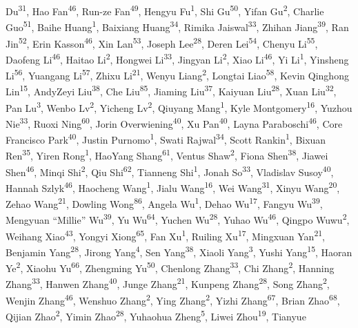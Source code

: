 Du\textsuperscript{31}, Hao Fan\textsuperscript{46}, Run-ze Fan\textsuperscript{49}, Hengyu Fu\textsuperscript{1}, Shi Gu\textsuperscript{50}, Yifan Gu\textsuperscript{2}, Charlie Guo\textsuperscript{51}, Baihe Huang\textsuperscript{1}, Baixiang Huang\textsuperscript{34}, Rimika Jaiswal\textsuperscript{33}, Zhihan Jiang\textsuperscript{39}, Ran Jin\textsuperscript{52}, Erin Kasson\textsuperscript{46}, Xin Lan\textsuperscript{53}, Joseph Lee\textsuperscript{28}, Deren Lei\textsuperscript{54}, Chenyu Li\textsuperscript{55}, Daofeng Li\textsuperscript{46}, Haitao Li\textsuperscript{2}, Hongwei Li\textsuperscript{33}, Jingyan Li\textsuperscript{2}, Xiao Li\textsuperscript{46}, Yi Li\textsuperscript{1}, Yinsheng Li\textsuperscript{56}, Yuangang Li\textsuperscript{57}, Zhixu Li\textsuperscript{21}, Wenyu Liang\textsuperscript{2}, Longtai Liao\textsuperscript{58}, Kevin Qinghong Lin\textsuperscript{15}, AndyZeyi Liu\textsuperscript{38}, Che Liu\textsuperscript{85}, Jiaming Liu\textsuperscript{37}, Kaiyuan Liu\textsuperscript{28}, Xuan Liu\textsuperscript{32}, Pan Lu\textsuperscript{3}, Wenbo Lv\textsuperscript{2}, Yicheng Lv\textsuperscript{2}, Qiuyang Mang\textsuperscript{1}, Kyle Montgomery\textsuperscript{16}, Yuzhou Nie\textsuperscript{33}, Ruoxi Ning\textsuperscript{60}, Jorin Overwiening\textsuperscript{40}, Xu Pan\textsuperscript{40}, Layna Paraboschi\textsuperscript{46}, Core Francisco Park\textsuperscript{40}, Justin Purnomo\textsuperscript{1}, Swati Rajwal\textsuperscript{34}, Scott Rankin\textsuperscript{1}, Bixuan Ren\textsuperscript{35}, Yiren Rong\textsuperscript{1}, HaoYang Shang\textsuperscript{61}, Ventus Shaw\textsuperscript{2}, Fiona Shen\textsuperscript{38}, Jiawei Shen\textsuperscript{46}, Minqi Shi\textsuperscript{2}, Qiu Shi\textsuperscript{62}, Tianneng Shi\textsuperscript{1}, Jonah So\textsuperscript{33}, Vladislav Susoy\textsuperscript{40}, Hannah Szlyk\textsuperscript{46}, Haocheng Wang\textsuperscript{1}, Jialu Wang\textsuperscript{16}, Wei Wang\textsuperscript{31}, Xinyu Wang\textsuperscript{20}, Zehao Wang\textsuperscript{21}, Dowling Wong\textsuperscript{86}, Angela Wu\textsuperscript{1}, Dehao Wu\textsuperscript{17}, Fangyu Wu\textsuperscript{39}, Mengyuan ``Millie'' Wu\textsuperscript{39}, Yu Wu\textsuperscript{64}, Yuchen Wu\textsuperscript{28}, Yuhao Wu\textsuperscript{46}, Qingpo Wuwu\textsuperscript{2}, Weihang Xiao\textsuperscript{43}, Yongyi Xiong\textsuperscript{65}, Fan Xu\textsuperscript{1}, Ruiling Xu\textsuperscript{17}, Mingxuan Yan\textsuperscript{21}, Benjamin Yang\textsuperscript{28}, Jirong Yang\textsuperscript{4}, Sen Yang\textsuperscript{38}, Xiaoli Yang\textsuperscript{3}, Yushi Yang\textsuperscript{15}, Haoran Ye\textsuperscript{2}, Xiaohu Yu\textsuperscript{66}, Zhengming Yu\textsuperscript{50}, Chenlong Zhang\textsuperscript{33}, Chi Zhang\textsuperscript{2}, Hanning Zhang\textsuperscript{33}, Hanwen Zhang\textsuperscript{40}, Junge Zhang\textsuperscript{21}, Kunpeng Zhang\textsuperscript{28}, Song Zhang\textsuperscript{2}, Wenjin Zhang\textsuperscript{46}, Wenshuo Zhang\textsuperscript{2}, Ying Zhang\textsuperscript{2}, Yizhi Zhang\textsuperscript{67}, Brian Zhao\textsuperscript{68}, Qijian Zhao\textsuperscript{2}, Yimin Zhao\textsuperscript{28}, Yuhaohua Zheng\textsuperscript{5}, Liwei Zhou\textsuperscript{19}, Tianyue 